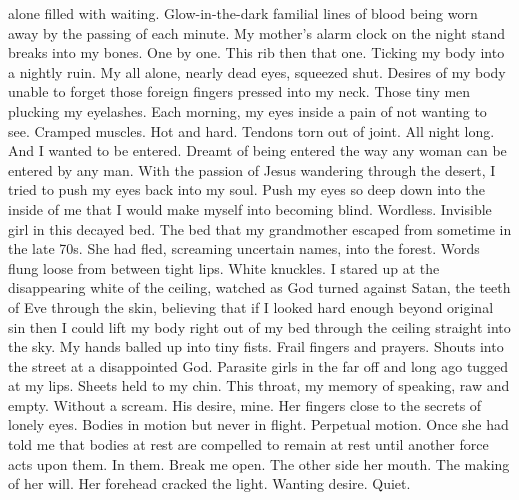 \documentclass[
]{memoir}
\begin{document}
alone filled with waiting. Glow-in-the-dark familial lines of blood
being worn away by the passing of each minute. My mother's alarm clock
on the night stand breaks into my bones. One by one. This rib then that
one. Ticking my body into a nightly ruin. My all alone, nearly dead
eyes, squeezed shut. Desires of my body unable to forget those foreign
fingers pressed into my neck. Those tiny men plucking my eyelashes. Each
morning, my eyes inside a pain of not wanting to see. Cramped muscles.
Hot and hard. Tendons torn out of joint. All night long. And I wanted to
be entered. Dreamt of being entered the way any woman can be entered by
any man. With the passion of Jesus wandering through the desert, I tried
to push my eyes back into my soul. Push my eyes so deep down into the
inside of me that I would make myself into becoming blind. Wordless.
Invisible girl in this decayed bed. The bed that my grandmother escaped
from sometime in the late 70s. She had fled, screaming uncertain names,
into the forest. Words flung loose from between tight lips. White
knuckles. I stared up at the disappearing white of the ceiling, watched
as God turned against Satan, the teeth of Eve through the skin,
believing that if I looked hard enough beyond original sin then I could
lift my body right out of my bed through the ceiling straight into the
sky. My hands balled up into tiny fists. Frail fingers and prayers.
Shouts into the street at a disappointed God. Parasite girls in the far
off and long ago tugged at my lips. Sheets held to my chin. This throat,
my memory of speaking, raw and empty. Without a scream. His desire,
mine. Her fingers close to the secrets of lonely eyes. Bodies in motion
but never in flight. Perpetual motion. Once she had told me that bodies
at rest are compelled to remain at rest until another force acts upon
them. In them. Break me open. The other side her mouth. The making of
her will. Her forehead cracked the light. Wanting desire. Quiet.
\end{document}
